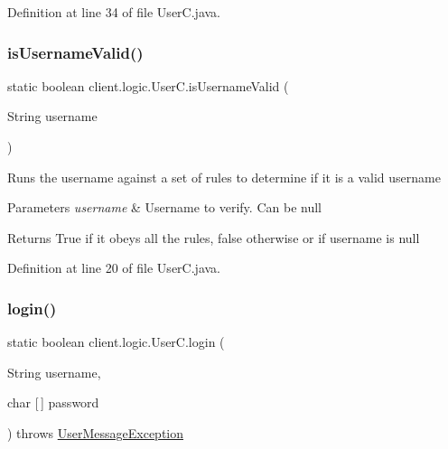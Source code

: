 Definition at line 34 of file User\+C.\+java.

\hypertarget{classclient_1_1logic_1_1_user_c_a62765c4c4912ee02b3ef70f1b9c0fb4e}{}\label{classclient_1_1logic_1_1_user_c_a62765c4c4912ee02b3ef70f1b9c0fb4e} 
\subsubsection{\texorpdfstring{is\+Username\+Valid()}{isUsernameValid()}}
{\footnotesize\ttfamily static boolean client.\+logic.\+User\+C.\+is\+Username\+Valid (\begin{DoxyParamCaption}\item[{String}]{username }\end{DoxyParamCaption})\hspace{0.3cm}{\ttfamily [static]}}

Runs the username against a set of rules to determine if it is a valid username


\begin{DoxyParams}{Parameters}
{\em username} & Username to verify. Can be null \\
\hline
\end{DoxyParams}
\begin{DoxyReturn}{Returns}
True if it obeys all the rules, false otherwise or if username is null 
\end{DoxyReturn}


Definition at line 20 of file User\+C.\+java.

\hypertarget{classclient_1_1logic_1_1_user_c_aa3736b2a54be77a2b631ca49b9980a8c}{}\label{classclient_1_1logic_1_1_user_c_aa3736b2a54be77a2b631ca49b9980a8c} 
\subsubsection{\texorpdfstring{login()}{login()}}
{\footnotesize\ttfamily static boolean client.\+logic.\+User\+C.\+login (\begin{DoxyParamCaption}\item[{String}]{username,  }\item[{char \mbox{[}$\,$\mbox{]}}]{password }\end{DoxyParamCaption}) throws \hyperlink{classsharedlib_1_1exceptions_1_1_user_message_exception}{User\+Message\+Exception}\hspace{0.3cm}{\ttfamily [static]}}


